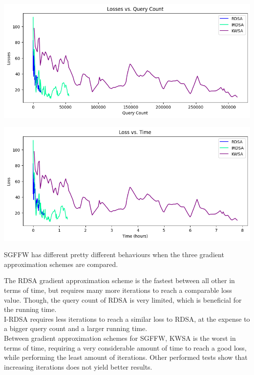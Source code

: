 \documentclass[10pt,twocolumn,letterpaper]{article}
\begin{document}
\begin{center}
   \includegraphics*[scale=0.35]{img/SGFFW_loss_vs_querycount.png}
\end{center}

\begin{center}
   \includegraphics*[scale=0.35]{img/SGFFW_loss_vs_runningtime.png}
\end{center}

SGFFW has different pretty different behaviours when the three gradient approximation schemes
are compared.

The RDSA gradient approximation scheme is the fastest between all other 
in terms of time, but requires many more iterations to reach a comparable loss value.
Though, the query count of RDSA is very limited, which is beneficial for the running time.\\

I-RDSA requires less iterations to reach a similar loss to RDSA, at the expense to a bigger query
count and a larger running time. \\

Between gradient approximation schemes for SGFFW, KWSA is the worst in terms of time, requiring
a very considerable amount of time to reach a good loss, while performing the least amount of iterations.
Other performed tests show that increasing iterations does not yield better results. \\
\end{document}
